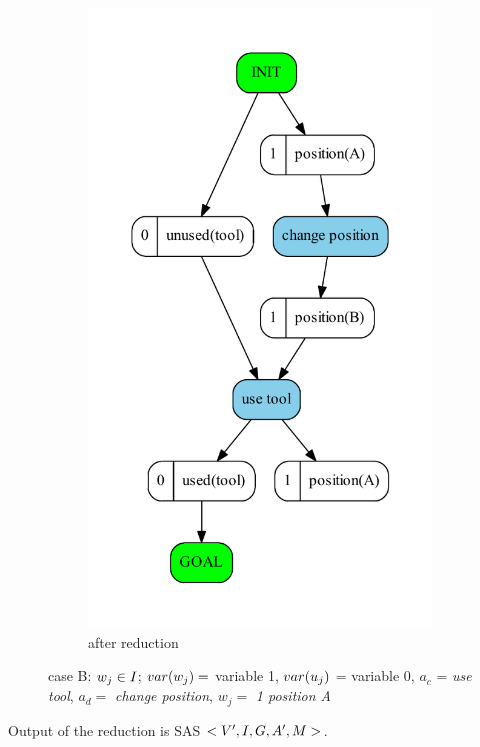 \begin{figure}
\begin{subfigure}[b]{0.4\textwidth}
			\includegraphics[scale=0.4]{oneUsage/figures/endsInInit_output}
			\caption{after reduction}
		\end{subfigure}
		\caption{case B: $w_j \in I$; $var(w_j) = $ variable 1, $var(u_j)$ = variable 0, $a_c$ = \emph{use tool}, $a_d = $ \emph{change position}, $w_j = $ \emph{1 position A}}		
	\end{figure}
	
	
	Output of the reduction is SAS $<V{}', I{}, G{}, A{}', M{}>$.
	
